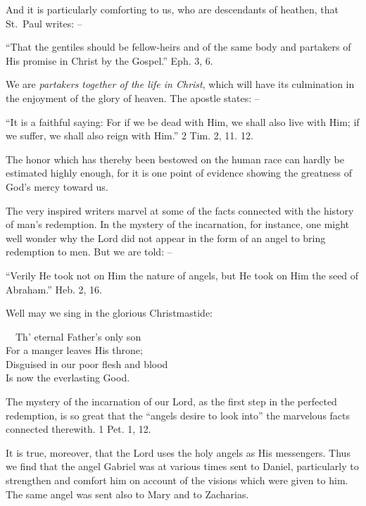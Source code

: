 \documentclass[
]{book}
\begin{document}
And it is particularly comforting to us, who are descendants of heathen, that St.~Paul writes: --

``That the gentiles should be fellow-heirs and of the same body and partakers of His promise in Christ by the Gospel.'' Eph. 3, 6.

We are \emph{partakers together of the life in Christ}, which will have its culmination in the enjoyment of the glory of heaven. The apostle states: --

``It is a faithful saying: For if we be dead with Him, we shall also live with Him; if we suffer, we shall also reign with Him.'' 2 Tim. 2, 11. 12.

The honor which has thereby been bestowed on the human race can hardly be estimated highly enough, for it is one point of evidence showing the greatness of God's mercy toward us.

The very inspired writers marvel at some of the facts connected with the history of man's redemption. In the mystery of the incarnation, for instance, one might well wonder why the Lord did not appear in the form of an angel to bring redemption to men. But we are told: --

``Verily He took not on Him the nature of angels, but He took on Him the seed of Abraham.'' Heb. 2, 16.

Well may we sing in the glorious Christmastide:

~~Th' eternal Father's only son\\
\hspace*{0.333em}\hspace*{0.333em}For a manger leaves His throne;\\
\hspace*{0.333em}\hspace*{0.333em}Disguised in our poor flesh and blood\\
\hspace*{0.333em}\hspace*{0.333em}Is now the everlasting Good.

The mystery of the incarnation of our Lord, as the first step in the perfected redemption, is so great that the ``angels desire to look into'' the marvelous facts connected therewith. 1 Pet. 1, 12.

It is true, moreover, that the Lord uses the holy angels as His messengers. Thus we find that the angel Gabriel was at various times sent to Daniel, particularly to strengthen and comfort him on account of the visions which were given to him. The same angel was sent also to Mary and to Zacharias.
\end{document}
